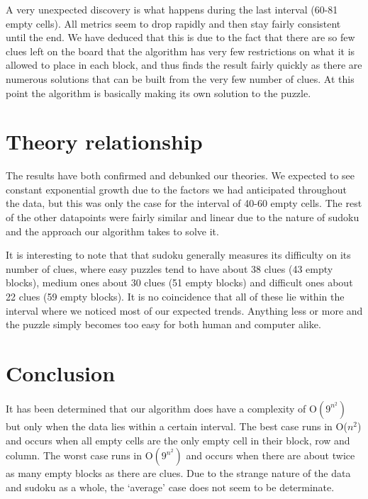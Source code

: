 \documentclass{article}
\begin{document}
    A very unexpected discovery is what happens during the last interval (60-81 empty cells). All metrics seem to drop rapidly and then stay fairly consistent until the end. We have deduced that this is due to the fact that there are so few clues left on the board that the algorithm has very few restrictions on what it is allowed to place in each block, and thus finds the result fairly quickly as there are numerous solutions that can be built from the very few number of clues. At this point the algorithm is basically making its own solution to the puzzle. 

    \pagebreak 
    \section{Theory relationship}
    The results have both confirmed and debunked our theories. We expected to see constant exponential growth due to the factors we had anticipated throughout the data, but this was only the case for the interval of 40-60 empty cells. The rest of the other datapoints were fairly similar and linear due to the nature of sudoku and the approach our algorithm takes to solve it.


    It is interesting to note that that sudoku generally measures its difficulty on its number of clues, where easy puzzles tend to have about 38 clues (43 empty blocks), medium ones about 30 clues (51 empty blocks) and difficult ones about 22 clues (59 empty blocks). It is no coincidence that all of these lie within the interval where we noticed most of our expected trends. Anything less or more and the puzzle simply becomes too easy for both human and computer alike. 

    \section{Conclusion}
    It has been determined that our algorithm does have a complexity of O$(9^{n^2})$  but only when the data lies within a certain interval. The best case runs in O($n^2$) and occurs when all empty cells are the only empty cell in their block, row and column. The worst case runs in O$(9^{n^2})$ and occurs when there are about twice as many empty blocks as there are clues. Due to the strange nature of the data and sudoku as a whole, the ‘average’ case does not seem to be determinate.

    \pagebreak
    
    

\end{document}
